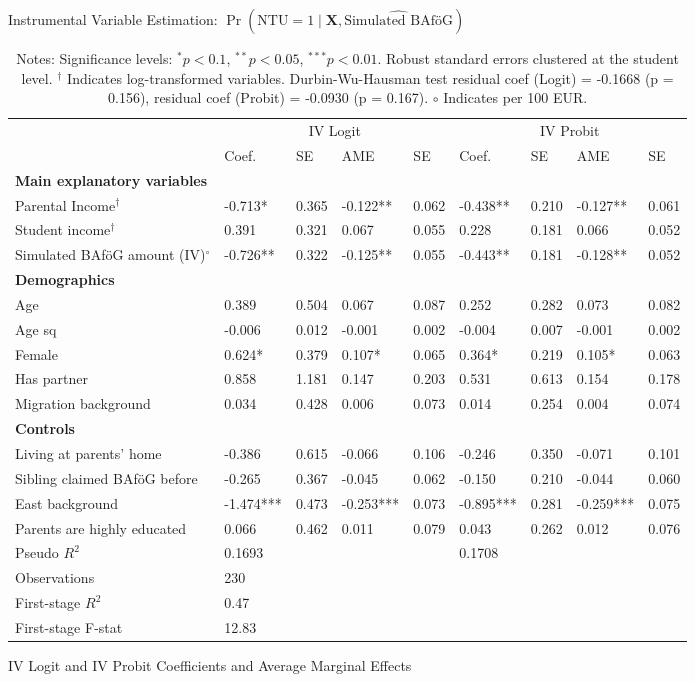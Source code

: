 \begin{table}
\caption{Instrumental Variable Estimation: $\Pr(\mathrm{NTU} = 1 \mid \mathbf{X}, \widehat{\text{Simulated BAföG}})$}
\renewcommand{\arraystretch}{1.25}
\footnotesize
\centering
\begin{tabular}{lllllllll}
\toprule
 & \multicolumn{4}{c}{IV Logit} & \multicolumn{4}{c}{IV Probit} \\
\cmidrule(lr){2-5} \cmidrule(lr){6-9}
 & Coef. & SE & AME & SE & Coef. & SE & AME & SE \\
\midrule
\multicolumn{9}{l}{\textbf{Main explanatory variables}} \\
Parental Income$^\dagger$ & -0.713* & 0.365 & -0.122** & 0.062 & -0.438** & 0.210 & -0.127** & 0.061 \\
Student income$^\dagger$ & 0.391 & 0.321 & 0.067 & 0.055 & 0.228 & 0.181 & 0.066 & 0.052 \\
Simulated BAföG amount (IV)$^{\circ}$ & -0.726** & 0.322 & -0.125** & 0.055 & -0.443** & 0.181 & -0.128** & 0.052 \\
\midrule
\multicolumn{9}{l}{\textbf{Demographics}} \\
Age & 0.389 & 0.504 & 0.067 & 0.087 & 0.252 & 0.282 & 0.073 & 0.082 \\
Age sq & -0.006 & 0.012 & -0.001 & 0.002 & -0.004 & 0.007 & -0.001 & 0.002 \\
Female & 0.624* & 0.379 & 0.107* & 0.065 & 0.364* & 0.219 & 0.105* & 0.063 \\
Has partner & 0.858 & 1.181 & 0.147 & 0.203 & 0.531 & 0.613 & 0.154 & 0.178 \\
Migration background & 0.034 & 0.428 & 0.006 & 0.073 & 0.014 & 0.254 & 0.004 & 0.074 \\
\midrule
\multicolumn{9}{l}{\textbf{Controls}} \\
Living at parents’ home & -0.386 & 0.615 & -0.066 & 0.106 & -0.246 & 0.350 & -0.071 & 0.101 \\
Sibling claimed BAföG before & -0.265 & 0.367 & -0.045 & 0.062 & -0.150 & 0.210 & -0.044 & 0.060 \\
East background & -1.474*** & 0.473 & -0.253*** & 0.073 & -0.895*** & 0.281 & -0.259*** & 0.075 \\
Parents are highly educated & 0.066 & 0.462 & 0.011 & 0.079 & 0.043 & 0.262 & 0.012 & 0.076 \\
\midrule
Pseudo $R^2$ & \multicolumn{4}{l}{0.1693} & \multicolumn{4}{l}{0.1708} \\
Observations & \multicolumn{8}{l}{230} \\
\midrule
First-stage $R^2$ & \multicolumn{8}{l}{0.47} \\
First-stage F-stat & \multicolumn{8}{l}{12.83} \\
\bottomrule
\end{tabular}
\caption*{IV Logit and IV Probit Coefficients and Average Marginal Effects}
\label{tab:iv_logit_probit_results}
\caption*{\small{Notes: Significance levels: $^{*} p < 0.1$, $^{**} p < 0.05$, $^{***} p < 0.01$. Robust standard errors clustered at the student level. $^\dagger$ Indicates log-transformed variables. Durbin-Wu-Hausman test residual coef (Logit) = -0.1668 (p = 0.156), residual coef (Probit) = -0.0930 (p = 0.167). $\circ$ Indicates per 100 EUR.}}
\end{table}
